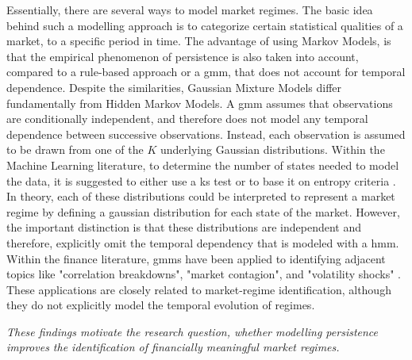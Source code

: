 Essentially, there are several ways to model market regimes. The basic idea behind such a modelling approach is to categorize certain statistical qualities of a market, to a specific period in time. 
The advantage of using Markov Models, is that the empirical phenomenon of persistence is also taken into account, compared to a rule-based approach or a \gls{gmm}, that does not account for temporal dependence. 
Despite the similarities, Gaussian Mixture Models differ fundamentally from Hidden Markov Models. A \gls{gmm} assumes that observations are conditionally independent, and therefore does not model any temporal dependence between successive observations. 
Instead, each observation is assumed to be drawn from one of the $K$ underlying Gaussian distributions. Within the Machine Learning literature, to determine the number of states needed to model the data, it is suggested to either use a \gls{ks} test or to base it on entropy criteria \citep{machinelearning2020_chapter2}.
In theory, each of these distributions could be interpreted to represent a market regime by defining a gaussian distribution for each state of the market. However, the important distinction is that these distributions are independent and therefore, explicitly omit the temporal dependency that is modeled with a \gls{hmm}. 
Within the finance literature, \gls{gmm}s have been applied to identifying adjacent topics like "correlation breakdowns", "market contagion", and "volatility shocks" \citep{machinelearning2020_chapter2}.
These applications are closely related to market-regime identification, although they do not explicitly model the temporal evolution of regimes. 


\emph{These findings motivate the research question, whether modelling persistence improves the identification of financially meaningful market regimes.} %



